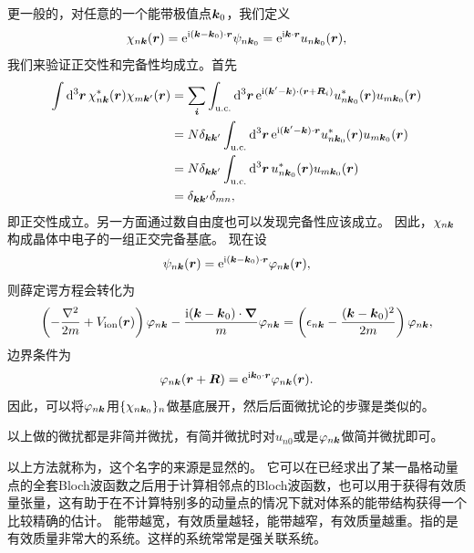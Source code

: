 更一般的，对任意的一个能带极值点$\vb*{k}_0$，我们定义
\begin{equation}
    \chi_{n \vb*{k}}(\vb*{r}) = \mathrm{e}^{\mathrm{i} (\vb*{k} - \vb*{k}_0) \cdot \vb*{r}} \psi_{n \vb*{k}_0} = \mathrm{e}^{\mathrm{i} \vb*{k} \cdot \vb*{r}} u_{n \vb*{k}_0} (\vb*{r}),
\end{equation}
我们来验证正交性和完备性均成立。首先
\[
    \begin{aligned}
        \int \dd[3]{\vb*{r}} \chi^*_{n \vb*{k}}(\vb*{r}) \chi_{m \vb*{k}'}(\vb*{r}) &= \sum_{\vb*{i}} \int_\text{u.c.} \dd[3]{\vb*{r}} \mathrm{e}^{\mathrm{i} (\vb*{k}' - \vb*{k}) \cdot (\vb*{r} + \vb*{R}_i)} u^*_{n \vb*{k}_0}(\vb*{r}) u_{m \vb*{k}_0}(\vb*{r}) \\
        &= N \delta_{\vb*{k} \vb*{k}'} \int_\text{u.c.} \dd[3]{\vb*{r}} \mathrm{e}^{\mathrm{i} (\vb*{k}' - \vb*{k}) \cdot \vb*{r}} u^*_{n \vb*{k}_0}(\vb*{r}) u_{m \vb*{k}_0}(\vb*{r}) \\
        &= N \delta_{\vb*{k} \vb*{k}'} \int_\text{u.c.} \dd[3]{\vb*{r}} u^*_{n \vb*{k}_0}(\vb*{r}) u_{m \vb*{k}_0}(\vb*{r}) \\
        &= \delta_{\vb*{k} \vb*{k}'} \delta_{mn},
    \end{aligned}
\]
即正交性成立。另一方面通过数自由度也可以发现完备性应该成立。
因此，$\chi_{n \vb*{k}}$构成晶体中电子的一组正交完备基底。
现在设
\begin{equation}
    \psi_{n \vb*{k}}(\vb*{r}) = \mathrm{e}^{\mathrm{i} (\vb*{k} - \vb*{k}_0) \cdot \vb*{r}} \varphi_{n \vb*{k}}(\vb*{r}),
\end{equation}
则薛定谔方程会转化为
\begin{equation}
    \left( - \frac{\laplacian}{2m} + V_\text{ion}(\vb*{r}) \right) \varphi_{n \vb*{k}} - \frac{\ii (\vb*{k} - \vb*{k}_0) \cdot \grad}{m} \varphi_{n \vb*{k}} = \left( \epsilon_{n \vb*{k}} - \frac{(\vb*{k} - \vb*{k}_0)^2}{2m} \right) \varphi_{n \vb*{k}},
\end{equation}
边界条件为
\begin{equation}
    \varphi_{n \vb*{k}}(\vb*{r} + \vb*{R}) = \mathrm{e}^{\mathrm{i} \vb*{k}_0 \cdot \vb*{r}} \varphi_{n \vb*{k}}(\vb*{r}).
\end{equation}
因此，可以将$\varphi_{n \vb*{k}}$用$\{\chi_{n \vb*{k}_0}\}_n$做基底展开，然后后面微扰论的步骤是类似的。

以上做的微扰都是非简并微扰，有简并微扰时对$u_{n0}$或是$\varphi_{n \vb*{k}}$做简并微扰即可。

以上方法就称为，这个名字的来源是显然的。
它可以在已经求出了某一晶格动量点的全套Bloch波函数之后用于计算相邻点的Bloch波函数，也可以用于获得有效质量张量，这有助于在不计算特别多的动量点的情况下就对体系的能带结构获得一个比较精确的估计。
能带越宽，有效质量越轻，能带越窄，有效质量越重。指的是有效质量非常大的系统。这样的系统常常是强关联系统。

